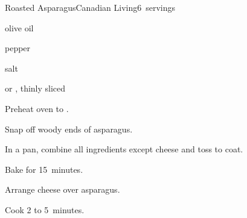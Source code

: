 \begin{recipe}{Roasted Asparagus}{Canadian Living}{6~servings}

\begin{ingredients}
\item {} 
\item {} olive oil
\item \tp{\half} pepper
\item \tp{\quarter} salt
\item {}  or , thinly sliced
\end{ingredients}

\begin{directions}
\item Preheat oven to .
\item Snap off woody ends of asparagus.
\item In a pan, combine all ingredients except cheese and toss to coat.
\item Bake for 15~minutes.
\item Arrange cheese over asparagus.
\item Cook 2 to 5~minutes.
\end{directions}

\end{recipe}

